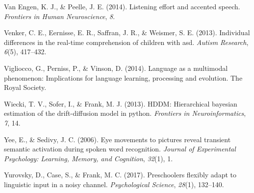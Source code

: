 \documentclass[english,floatsintext,man]{apa6}
\begin{document}
\leavevmode\hypertarget{ref-van2014listening}{}%
Van Engen, K. J., \& Peelle, J. E. (2014). Listening effort and accented
speech. \emph{Frontiers in Human Neuroscience}, \emph{8}.

\leavevmode\hypertarget{ref-venker2013individual}{}%
Venker, C. E., Eernisse, E. R., Saffran, J. R., \& Weismer, S. E.
(2013). Individual differences in the real-time comprehension of
children with asd. \emph{Autism Research}, \emph{6}(5), 417--432.

\leavevmode\hypertarget{ref-vigliocco2014language}{}%
Vigliocco, G., Perniss, P., \& Vinson, D. (2014). Language as a
multimodal phenomenon: Implications for language learning, processing
and evolution. The Royal Society.

\leavevmode\hypertarget{ref-wiecki2013hddm}{}%
Wiecki, T. V., Sofer, I., \& Frank, M. J. (2013). HDDM: Hierarchical
bayesian estimation of the drift-diffusion model in python.
\emph{Frontiers in Neuroinformatics}, \emph{7}, 14.

\leavevmode\hypertarget{ref-yee2006eye}{}%
Yee, E., \& Sedivy, J. C. (2006). Eye movements to pictures reveal
transient semantic activation during spoken word recognition.
\emph{Journal of Experimental Psychology: Learning, Memory, and
Cognition}, \emph{32}(1), 1.

\leavevmode\hypertarget{ref-yurovsky2017preschoolers}{}%
Yurovsky, D., Case, S., \& Frank, M. C. (2017). Preschoolers flexibly
adapt to linguistic input in a noisy channel. \emph{Psychological
Science}, \emph{28}(1), 132--140.
\end{document}
